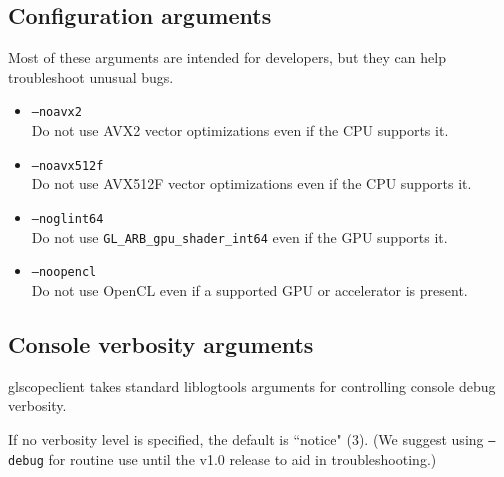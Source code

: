 \subsection{Configuration arguments}

Most of these arguments are intended for developers, but they can help troubleshoot unusual bugs.

\begin{itemize}

\item \texttt{--noavx2}\\
Do not use AVX2 vector optimizations even if the CPU supports it.

\item \texttt{--noavx512f}\\
Do not use AVX512F vector optimizations even if the CPU supports it.

\item \texttt{--noglint64}\\
Do not use \texttt{GL\_ARB\_gpu\_shader\_int64} even if the GPU supports it.

\item \texttt{--noopencl}\\
Do not use OpenCL even if a supported GPU or accelerator is present.

\end{itemize}

\subsection{Console verbosity arguments}

glscopeclient takes standard liblogtools arguments for controlling console debug verbosity.

If no verbosity level is specified, the default is ``notice" (3). (We suggest using \texttt{--debug} for routine use
until the v1.0 release to aid in troubleshooting.)

